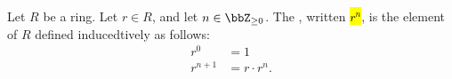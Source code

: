 \begin{definition} \label{definition:power_of_an_element_of_a_ring_by_a_nonnegative_integer}
    Let $R$ be a ring. Let $r \in R$, and let $n \in \bbZ_{\geq 0}$. The , written \hl{$r^n$}, is the element of $R$ defined inducedtively as follows:
    \begin{align*}
        r^0 &= 1 \\
        r^{n+1} &= r \cdot r^n.
    \end{align*}
\end{definition}
